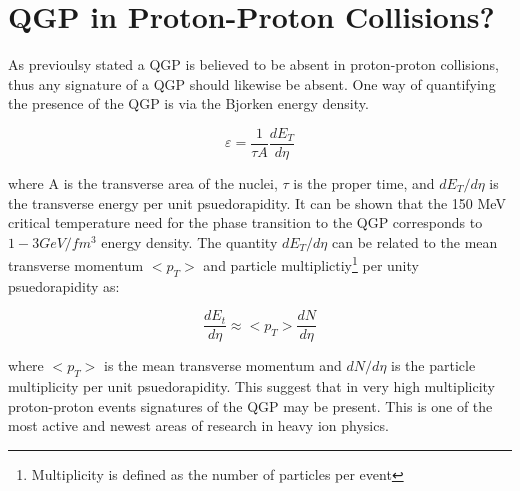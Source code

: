\section{QGP in Proton-Proton Collisions?}
As previoulsy stated a QGP is believed to be absent in proton-proton collisions, thus any signature of a QGP should likewise be absent.  One way of quantifying the presence of the QGP is via the Bjorken energy density.  

\begin{equation}
\varepsilon = \frac{1}{\tau A} \frac{dE_{T}}{d \eta}
\label{eq:bjorkenEt}
\end{equation}

\noindent
where A is the transverse area of the nuclei, $\tau$ is the proper time, and $dE_{T}/d \eta$ is the transverse energy per unit psuedorapidity.  It can be shown that  the 150 MeV critical temperature need for the phase transition to the QGP corresponds to ~ $1 - 3 GeV/fm^{3}$ energy density.  The quantity $dE_{T}/d \eta$ can be related to the mean transverse momentum $<p_{T}>$ and particle multiplictiy\footnote{Multiplicity is defined as the number of particles per event} per unity psuedorapidity as:

\begin{equation}
\frac{dE_{t}}{d \eta}  \approx  <p_{T}> \frac{dN}{d\eta}
\label{eq:Et}
\end{equation}

where $ <p_{T} >$ is the mean transverse momentum and $dN/d\eta$ is the particle multiplicity per unit psuedorapidity.
This suggest that in very high multiplicity proton-proton events signatures of the QGP may be present.  This is one of the most active and newest areas of research in heavy ion physics.  